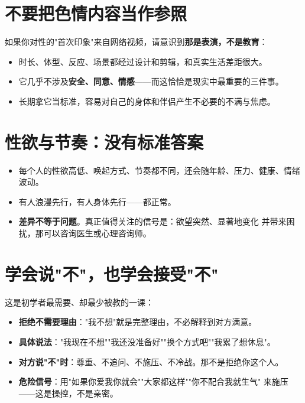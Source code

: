 \documentclass[12pt,UTF8,openany]{ctexbook}
\begin{document}
\section{不要把色情内容当作参照}

如果你对性的"首次印象"来自网络视频，请意识到\textbf{那是表演，不是教育}：

\begin{itemize}[leftmargin=2em]
  \item 时长、体型、反应、场景都经过设计和剪辑，和真实生活差距很大。
  \item 它几乎不涉及\textbf{安全、同意、情感}——而这恰恰是现实中最重要的三件事。
  \item 长期拿它当标准，容易对自己的身体和伴侣产生不必要的不满与焦虑。
\end{itemize}

\section{性欲与节奏：没有标准答案}

\begin{itemize}[leftmargin=2em]
  \item 每个人的性欲高低、唤起方式、节奏都不同，还会随年龄、压力、健康、情绪波动。
  \item 有人浪漫先行，有人身体先行——都正常。
  \item \textbf{差异不等于问题}。真正值得关注的信号是：欲望突然、显著地变化
        并带来困扰，那可以咨询医生或心理咨询师。
\end{itemize}

\section{学会说"不"，也学会接受"不"}

这是初学者最需要、却最少被教的一课：

\begin{itemize}[leftmargin=2em]
  \item \textbf{拒绝不需要理由}："我不想"就是完整理由，不必解释到对方满意。
  \item \textbf{具体说法}："我现在不想""我还没准备好""换个方式吧""我累了想休息"。
  \item \textbf{对方说"不"时}：尊重、不追问、不施压、不冷战。那不是拒绝你这个人。
  \item \textbf{危险信号}：用"如果你爱我你就会""大家都这样""你不配合我就生气"
        来施压——这是操控，不是亲密。
\end{itemize}
\end{document}

